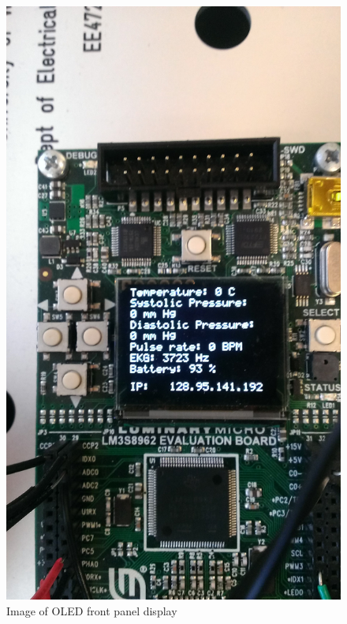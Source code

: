 \documentclass[12pt]{article} %
\begin{document}
\begin{itemize}
		\begin{figure}[h]
			\centering
			\includegraphics{../design/OLED_frontPanel.jpg}
			\caption{Image of OLED front panel display}
			\label{fig:oled_front_panel}
		\end{figure}


\end{itemize}
\end{document}
